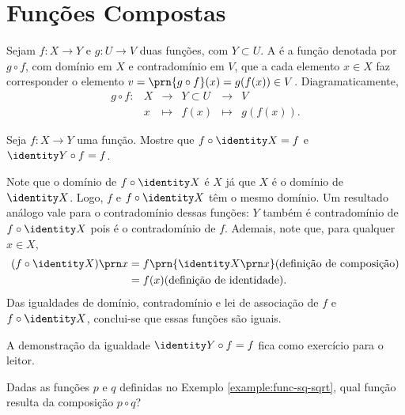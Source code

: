 \section{Funções Compostas}

\begin{definition}
Sejam $f: X \to Y$ e $g: U \to V$ duas funções, com $Y \subset U$. A  é a função denotada por $g \circ f$, com domínio em $X$ e contradomínio em $V$, que a cada elemento $x \in X$ faz corresponder o elemento $v = \prn{g \circ f}(x) = g(f(x)) \in V$. Diagramaticamente,
%
\begin{equation*}
\begin{array}{cccccc}
g \circ f : & X & \to     & Y \subset U & \to & V \\
     &  x & \mapsto & f(x) & \mapsto & g(f(x)).
\end{array}
\end{equation*}
\end{definition}

\begin{center}
\end{center}

\begin{example}
Seja $f: X \to Y$ uma função. Mostre que $f \circ \identity X = f$ e $\identity Y \circ f = f$.
\end{example}

\begin{solution}
Note que o domínio de $f \circ \identity X$ é $X$ já que $X$ é o domínio de $\identity X$. Logo, $f$ e $f \circ \identity X$ têm o mesmo domínio.
Um resultado análogo vale para o contradomínio dessas funções:  $Y$ também é contradomínio de $f \circ \identity X$ pois é o contradomínio de $f$.
Ademais, note que, para qualquer $x \in X$, 
%
\begin{align*}
(f \circ \identity X)\prn x &= f\prn{\identity X \prn x} \text{(definição de composição)} \\ &= f(x) \text{(definição de identidade)}.
\end{align*}
% 
Das igualdades de domínio, contradomínio e lei de associação de $f$ e $f \circ \identity X$, conclui-se que essas funções são iguais.

A demonstração da igualdade $\identity Y \circ f = f$ fica como exercício para o leitor.
\end{solution}

\begin{example}
\label{ex:comp-pq}
Dadas as funções $p$ e $q$ definidas no Exemplo \ref{example:func-sq-sqrt}, qual função resulta da composição $p \circ q$?
\end{example}

